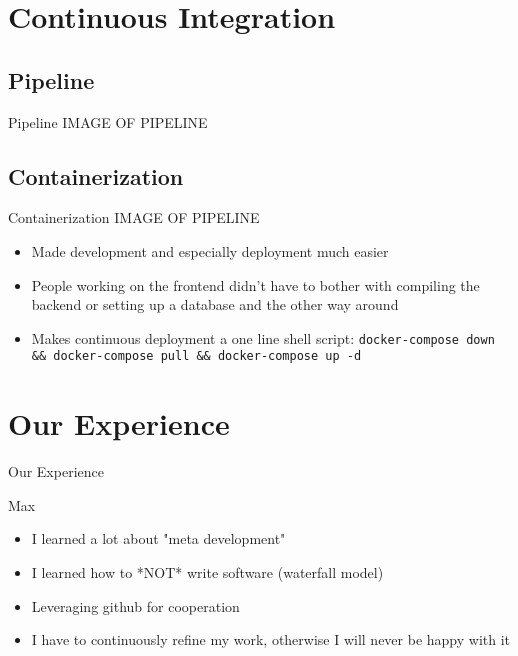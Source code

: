 \documentclass{beamer}
\begin{document}
\section{Continuous Integration}
\subsection{Pipeline}
\begin{frame}{Pipeline}
  \Large{IMAGE OF PIPELINE}
\end{frame}

\subsection{Containerization}
\begin{frame}{Containerization}
  \Large{IMAGE OF PIPELINE}
  \begin{itemize}
    \item Made development and especially deployment much easier
    \item People working on the frontend didn't have to bother with compiling the backend or setting up a database and the other way around
    \item Makes continuous deployment a one line shell script: \texttt{docker-compose down \&\& docker-compose pull \&\& docker-compose up -d}
  \end{itemize}
\end{frame}

\section{Our Experience}

\begin{frame}
  \begin{center}
    \Huge{Our Experience}
  \end{center}
\end{frame}

\begin{frame}{Max}
  \begin{itemize}
    \item I learned a lot about "meta development"
    \item I learned how to *NOT* write software (waterfall model)
    \item Leveraging github for cooperation
    \item I have to continuously refine my work, otherwise I will never be happy with it
  \end{itemize}
\end{frame}
\end{document}
